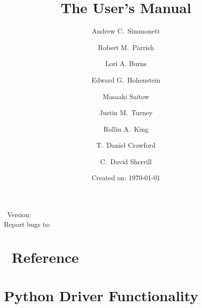 \documentclass[12pt]{article}
\begin{document}


\title{The \PSIfour User's Manual}
\date{Created on: \today}
%
%
\author{
Andrew C.\ Simmonett
\and Robert M.\ Parrish
\and Lori A. Burns
\and Edward G.\ Hohenstein
\and Masaaki Saitow
\and Justin M.\ Turney
\and Rollin A.\ King
\and T.\ Daniel Crawford
\and C.\ David Sherrill}

\maketitle

\PSIfour\ Version: \PSIversion \\
Report bugs to: \PSIemail \\

\thispagestyle{empty}

\newpage
\tableofcontents
\newpage






  
  
  
  
  
  
%  
  
  
   

%
%





\appendix
\section{\PSIfour\ Reference}\label{PSI_Reference}





\section{Python Driver Functionality}\label{sphinxpsithon}
 
\end{document}
